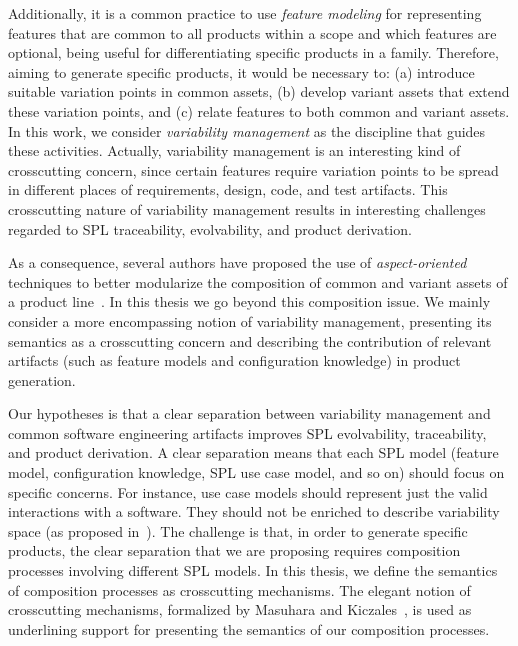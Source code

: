 \documentclass[times, 11pt,twocolumn]{article}
\begin{document}
Additionally, it is a common practice to use \emph{feature modeling} for
representing features that are common to all products within a scope and which
features are optional, being useful for differentiating specific products in a
family. Therefore, aiming to generate specific products, it would be necessary
to: (a) introduce suitable variation points in common assets, (b) develop variant
assets that extend these variation points, and (c) relate features to both common
and variant assets.  In this work, we consider \emph{variability management} as
the discipline that guides these activities. Actually, variability management is
an interesting kind of crosscutting concern, since certain features require
variation points to be spread in different places of requirements, design, code,
and test artifacts. This crosscutting nature of variability management results in
interesting challenges regarded to SPL traceability, evolvability, and product
derivation. 

As a consequence, several authors have proposed the use of
\emph{aspect-oriented} techniques to better modularize the composition of common
and variant assets of a product
line~\cite{Figueiredo:2008aa,Alves:2006aa,Apel:2006aa}. In this thesis we go
beyond this composition issue. We mainly consider a more encompassing notion of
variability management, presenting its semantics as a crosscutting concern and
describing the contribution of relevant artifacts (such as feature models and
configuration knowledge) in product generation.


Our hypotheses is that a clear separation between variability management and
common software engineering artifacts improves SPL evolvability, traceability,
and product derivation. A clear separation means that each SPL model (feature
model, configuration knowledge, SPL use case model, and so on) should focus on
specific concerns. For instance, use case models should represent just the valid
interactions with a software. They should not be enriched to describe variability
space (as proposed in~\cite{Bertolino:2003aa}). The challenge is that, in order
to generate specific products, the clear separation that we are proposing
requires composition processes involving different SPL models. In this thesis,
we define the semantics of composition processes as crosscutting mechanisms.
The elegant notion of crosscutting mechanisms, formalized by Masuhara and
Kiczales~\cite{Masuhara:2003aa}, is used as underlining support for presenting
the semantics of our composition processes. 
\end{document}
